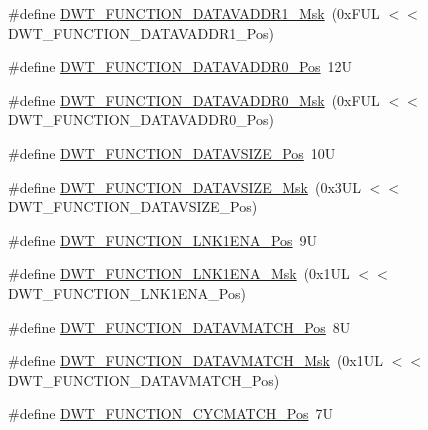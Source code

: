 \begin{DoxyCompactItemize}
\item 
\#define \hyperlink{group___c_m_s_i_s___d_w_t_gafdbf5a8c367befe8661a4f6945c83445}{D\-W\-T\-\_\-\-F\-U\-N\-C\-T\-I\-O\-N\-\_\-\-D\-A\-T\-A\-V\-A\-D\-D\-R1\-\_\-\-Msk}~(0x\-F\-U\-L $<$$<$ D\-W\-T\-\_\-\-F\-U\-N\-C\-T\-I\-O\-N\-\_\-\-D\-A\-T\-A\-V\-A\-D\-D\-R1\-\_\-\-Pos)
\item 
\#define \hyperlink{group___c_m_s_i_s___d_w_t_ga9854cd8bf16f7dce0fb196a8029b018e}{D\-W\-T\-\_\-\-F\-U\-N\-C\-T\-I\-O\-N\-\_\-\-D\-A\-T\-A\-V\-A\-D\-D\-R0\-\_\-\-Pos}~12\-U
\item 
\#define \hyperlink{group___c_m_s_i_s___d_w_t_gafc5efbe8f9b51e04aecd00c8a4eb50fb}{D\-W\-T\-\_\-\-F\-U\-N\-C\-T\-I\-O\-N\-\_\-\-D\-A\-T\-A\-V\-A\-D\-D\-R0\-\_\-\-Msk}~(0x\-F\-U\-L $<$$<$ D\-W\-T\-\_\-\-F\-U\-N\-C\-T\-I\-O\-N\-\_\-\-D\-A\-T\-A\-V\-A\-D\-D\-R0\-\_\-\-Pos)
\item 
\#define \hyperlink{group___c_m_s_i_s___d_w_t_ga0517a186d4d448aa6416440f40fe7a4d}{D\-W\-T\-\_\-\-F\-U\-N\-C\-T\-I\-O\-N\-\_\-\-D\-A\-T\-A\-V\-S\-I\-Z\-E\-\_\-\-Pos}~10\-U
\item 
\#define \hyperlink{group___c_m_s_i_s___d_w_t_gaab42cbc1e6084c44d5de70971613ea76}{D\-W\-T\-\_\-\-F\-U\-N\-C\-T\-I\-O\-N\-\_\-\-D\-A\-T\-A\-V\-S\-I\-Z\-E\-\_\-\-Msk}~(0x3\-U\-L $<$$<$ D\-W\-T\-\_\-\-F\-U\-N\-C\-T\-I\-O\-N\-\_\-\-D\-A\-T\-A\-V\-S\-I\-Z\-E\-\_\-\-Pos)
\item 
\#define \hyperlink{group___c_m_s_i_s___d_w_t_ga89d7c48858b4d4de96cdadfac91856a1}{D\-W\-T\-\_\-\-F\-U\-N\-C\-T\-I\-O\-N\-\_\-\-L\-N\-K1\-E\-N\-A\-\_\-\-Pos}~9\-U
\item 
\#define \hyperlink{group___c_m_s_i_s___d_w_t_ga64bd419260c3337cacf93607d1ad27ac}{D\-W\-T\-\_\-\-F\-U\-N\-C\-T\-I\-O\-N\-\_\-\-L\-N\-K1\-E\-N\-A\-\_\-\-Msk}~(0x1\-U\-L $<$$<$ D\-W\-T\-\_\-\-F\-U\-N\-C\-T\-I\-O\-N\-\_\-\-L\-N\-K1\-E\-N\-A\-\_\-\-Pos)
\item 
\#define \hyperlink{group___c_m_s_i_s___d_w_t_ga106f3672cd4be7c7c846e20497ebe5a6}{D\-W\-T\-\_\-\-F\-U\-N\-C\-T\-I\-O\-N\-\_\-\-D\-A\-T\-A\-V\-M\-A\-T\-C\-H\-\_\-\-Pos}~8\-U
\item 
\#define \hyperlink{group___c_m_s_i_s___d_w_t_ga32af1f1c0fcd2d8d9afd1ad79cd9970e}{D\-W\-T\-\_\-\-F\-U\-N\-C\-T\-I\-O\-N\-\_\-\-D\-A\-T\-A\-V\-M\-A\-T\-C\-H\-\_\-\-Msk}~(0x1\-U\-L $<$$<$ D\-W\-T\-\_\-\-F\-U\-N\-C\-T\-I\-O\-N\-\_\-\-D\-A\-T\-A\-V\-M\-A\-T\-C\-H\-\_\-\-Pos)
\item 
\#define \hyperlink{group___c_m_s_i_s___d_w_t_ga4b65d79ca37ae8010b4a726312413efd}{D\-W\-T\-\_\-\-F\-U\-N\-C\-T\-I\-O\-N\-\_\-\-C\-Y\-C\-M\-A\-T\-C\-H\-\_\-\-Pos}~7\-U
$$
\end{DoxyCompactItemize}
